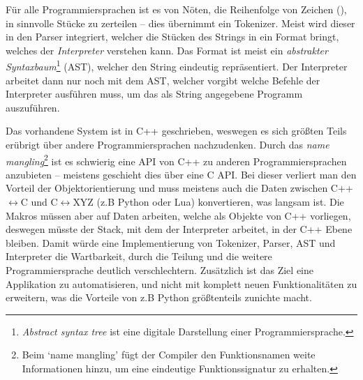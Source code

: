     Für alle Programmiersprachen ist es von Nöten, die Reihenfolge von Zeichen (), in sinnvolle Stücke zu zerteilen -- dies übernimmt ein Tokenizer. Meist wird dieser in den Parser\autocite[S.46]{eirund2013formale} integriert, welcher die Stücken des Strings in ein Format bringt, welches der \emph{Interpreter} \autocite[S.274]{Gamma:1995:DPE:186897} verstehen kann. Das Format ist meist ein \emph{abstrakter Syntaxbaum}\footnote{
      \textit{Abstract syntax tree} ist eine digitale Darstellung einer Programmiersprache.
    } (AST), welcher den String eindeutig repräsentiert. Der Interpreter arbeitet dann nur noch mit dem AST, welcher vorgibt welche Befehle der Interpreter ausführen muss, um das als String angegebene Programm auszuführen.

    Das vorhandene System ist in C++ geschrieben, weswegen es sich größten Teils erübrigt über andere Programmiersprachen nachzudenken. Durch das \emph{name mangling}\footnote{
      Beim `name mangling' fügt der Compiler den Funktionsnamen weite Informationen hinzu, um eine eindeutige Funktionssignatur zu erhalten.
    } ist es schwierig eine API von C++ zu anderen Programmiersprachen anzubieten -- meistens geschieht dies über eine C API. Bei dieser verliert man den Vorteil der Objektorientierung und muss meistens auch die Daten zwischen C++$\longleftrightarrow$C und C$\longleftrightarrow$XYZ (z.B Python oder Lua) konvertieren, was langsam ist. Die Makros müssen aber auf Daten arbeiten, welche als Objekte von C++ vorliegen, deswegen müsste der Stack, mit dem der Interpreter arbeitet, in der C++ Ebene bleiben. Damit würde eine Implementierung von Tokenizer, Parser, AST und Interpreter die Wartbarkeit, durch die Teilung und die weitere Programmiersprache deutlich verschlechtern. Zusätzlich ist das Ziel eine Applikation zu automatisieren, und nicht mit komplett neuen Funktionalitäten zu erweitern, was die Vorteile von z.B Python größtenteils zunichte macht.

